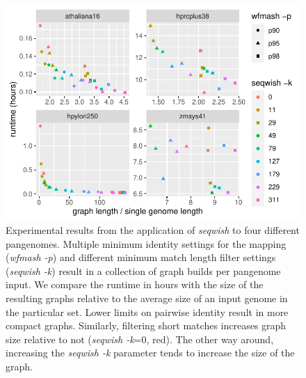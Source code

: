 \begin{figure}[b]
   \includegraphics[width=\linewidth, trim=0.4cm 0cm 0.4cm 1cm]{fig_experiment_stats}
   \caption{
     Experimental results from the application of \textit{seqwish} to four different pangenomes.
     Multiple minimum identity settings for the mapping (\textit{wfmash -p}) and different minimum match length filter settings (\textit{seqwish -k}) result in a collection of graph builds per pangenome input.
     We compare the runtime in hours with the size of the resulting graphs relative to the average size of an input genome in the particular set.
     Lower limits on pairwise identity result in more compact graphs.
     Similarly, filtering short matches increases graph size relative to not (\textit{seqwish -k}=0, red).
     The other way around, increasing the \textit{seqwish -k} parameter tends to increase the size of the graph.
    }
    \label{fig:experiments}
\end{figure}

